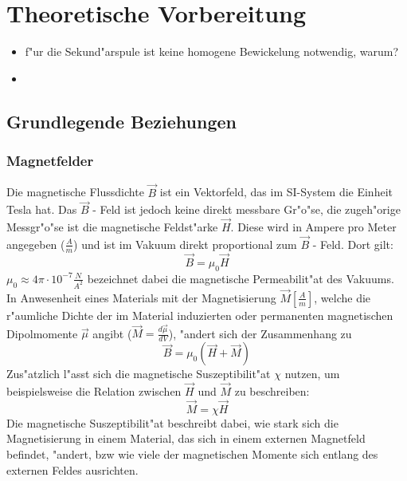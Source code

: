\section{Theoretische Vorbereitung}
    \begin{itemize}
        \item f"ur die Sekund"arspule ist keine homogene Bewickelung notwendig, warum?
        \item
    \end{itemize}
    \subsection{Grundlegende Beziehungen}
        \subsubsection{Magnetfelder}
            Die magnetische Flussdichte $\vec{B}$ ist ein Vektorfeld, das im SI-System die Einheit Tesla hat.
            Das $\vec{B}$ - Feld ist jedoch keine direkt messbare Gr"o"se, die zugeh"orige Messgr"o"se ist die magnetische Feldst"arke $\vec{H}$.
            Diese wird in Ampere pro Meter angegeben ($\frac{A}{m}$) und ist im Vakuum direkt proportional
            zum $\vec{B}$ - Feld. Dort gilt:
            \begin{equation}
                \vec{B} = \mu_0 \vec{H}
            \end{equation}
            $\mu_0\approx 4\pi \cdot 10^{-7}\frac{N}{A^2}$ bezeichnet dabei die magnetische Permeabilit"at des Vakuums.
            In Anwesenheit eines Materials mit der Magnetisierung $\vec{M} [\frac{A}{m}]$, welche die r"aumliche Dichte der im Material induzierten oder permanenten magnetischen Dipolmomente $\vec{\mu}$ angibt ($\vec{M} = \frac{d\vec{\mu}}{dV}$), "andert sich der Zusammenhang zu
            \begin{equation}
                \vec{B} = \mu_0 (\vec{H} + \vec{M})
            \end{equation}
            Zus"atzlich l"asst sich die magnetische Suszeptibilit"at $\chi$ nutzen, um beispielsweise die Relation zwischen $\vec{H}$ und $\vec{M}$ zu beschreiben:
            \begin{equation}
                \vec{M} = \chi \vec{H}
            \end{equation}
            Die magnetische Suszeptibilit"at beschreibt dabei, wie stark sich die Magnetisierung in einem
            Material, das sich in einem externen Magnetfeld befindet, "andert, bzw wie viele der magnetischen Momente sich entlang des externen Feldes ausrichten.
